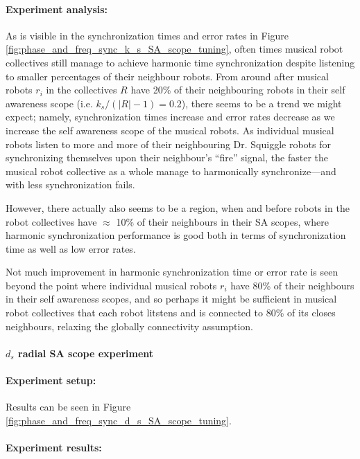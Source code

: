				\paragraph{Experiment analysis:\nl}
				
				As is visible in the synchronization times and error rates in Figure \ref{fig:phase_and_freq_sync_k_s_SA_scope_tuning}, often times musical robot collectives still manage to achieve harmonic time synchronization despite listening to smaller percentages of their neighbour robots. From around after musical robots $r_i$ in the collectives $R$ have 20\% of their neighbouring robots in their self awareness scope (i.e. $k_s/(|R|-1)=0.2$), there seems to be a trend we might expect; namely, synchronization times increase and error rates decrease as we increase the self awareness scope of the musical robots. As individual musical robots listen to more and more of their neighbouring Dr. Squiggle robots for synchronizing themselves upon their neighbour's ``fire'' signal, the faster the musical robot collective as a whole manage to harmonically synchronize—and with less synchronization fails.
				
				However, there actually also seems to be a region, when and before robots in the robot collectives have $\approx$ 10\% of their neighbours in their SA scopes, where harmonic synchronization performance is good both in terms of synchronization time as well as low error rates.
				
				Not much improvement in harmonic synchronization time or error rate is seen beyond the point where individual musical robots $r_i$ have 80\% of their neighbours in their self awareness scopes, and so perhaps it might be sufficient in musical robot collectives that each robot litstens and is connected to 80\% of its closes neighbours, relaxing the globally connectivity assumption.
				
			
			\paragraph{$d_s$ radial SA scope experiment}
				
				\paragraph{Experiment setup:\nl}
				
				Results can be seen in Figure \ref{fig:phase_and_freq_sync_d_s_SA_scope_tuning}.
				
				\paragraph{Experiment results:\nl}
				
